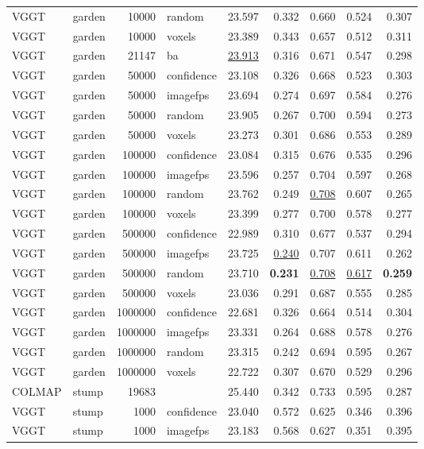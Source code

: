 \begin{table}[H]
\begin{tabular}{llrlrrrrr}
VGGT & garden & 10000 & random & 23.597 & 0.332 & 0.660 & 0.524 & 0.307 \\
VGGT & garden & 10000 & voxels & 23.389 & 0.343 & 0.657 & 0.512 & 0.311 \\
VGGT & garden & 21147 & ba & \underline{23.913} & 0.316 & 0.671 & 0.547 & 0.298 \\
VGGT & garden & 50000 & confidence & 23.108 & 0.326 & 0.668 & 0.523 & 0.303 \\
VGGT & garden & 50000 & imagefps & 23.694 & 0.274 & 0.697 & 0.584 & 0.276 \\
VGGT & garden & 50000 & random & 23.905 & 0.267 & 0.700 & 0.594 & 0.273 \\
VGGT & garden & 50000 & voxels & 23.273 & 0.301 & 0.686 & 0.553 & 0.289 \\
VGGT & garden & 100000 & confidence & 23.084 & 0.315 & 0.676 & 0.535 & 0.296 \\
VGGT & garden & 100000 & imagefps & 23.596 & 0.257 & 0.704 & 0.597 & 0.268 \\
VGGT & garden & 100000 & random & 23.762 & 0.249 & \underline{0.708} & 0.607 & 0.265 \\
VGGT & garden & 100000 & voxels & 23.399 & 0.277 & 0.700 & 0.578 & 0.277 \\
VGGT & garden & 500000 & confidence & 22.989 & 0.310 & 0.677 & 0.537 & 0.294 \\
VGGT & garden & 500000 & imagefps & 23.725 & \underline{0.240} & 0.707 & 0.611 & 0.262 \\
VGGT & garden & 500000 & random & 23.710 & \textbf{0.231} & \underline{0.708} & \underline{0.617} & \textbf{0.259} \\
VGGT & garden & 500000 & voxels & 23.036 & 0.291 & 0.687 & 0.555 & 0.285 \\
VGGT & garden & 1000000 & confidence & 22.681 & 0.326 & 0.664 & 0.514 & 0.304 \\
VGGT & garden & 1000000 & imagefps & 23.331 & 0.264 & 0.688 & 0.578 & 0.276 \\
VGGT & garden & 1000000 & random & 23.315 & 0.242 & 0.694 & 0.595 & 0.267 \\
VGGT & garden & 1000000 & voxels & 22.722 & 0.307 & 0.670 & 0.529 & 0.296 \\
\midrule
COLMAP & stump & 19683 &  & 25.440 & 0.342 & 0.733 & 0.595 & 0.287 \\
VGGT & stump & 1000 & confidence & 23.040 & 0.572 & 0.625 & 0.346 & 0.396 \\
VGGT & stump & 1000 & imagefps & 23.183 & 0.568 & 0.627 & 0.351 & 0.395 \\

\end{tabular}
\end{table}
